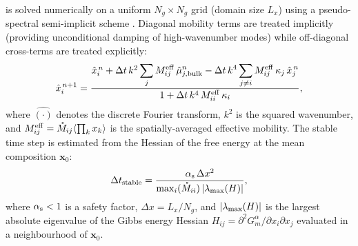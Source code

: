  is solved numerically on a uniform
$N_g \times N_g$ grid (domain size $L_x$) using a pseudo-spectral
semi-implicit scheme \cite{chen2002phase}.  Diagonal mobility terms
are treated implicitly (providing unconditional damping of
high-wavenumber modes) while off-diagonal cross-terms are treated
explicitly:
%
\begin{equation}\label{eq:semi_implicit}
    \hat{x}_i^{\,n+1}
    = \frac{
        \hat{x}_i^{\,n}
        + \Delta t\,k^2 \displaystyle\sum_j M^{\rm eff}_{ij}\,\hat{\mu}_{j,\rm bulk}^n
        - \Delta t\,k^4 \displaystyle\sum_{j \neq i} M^{\rm eff}_{ij}\,\kappa_j\,\hat{x}_j^{\,n}
      }{
        1 + \Delta t\,k^4\,M^{\rm eff}_{ii}\,\kappa_i
      },
\end{equation}
%
where $\hat{(\cdot)}$ denotes the discrete Fourier transform,
$k^2$ is the squared wavenumber, and
$M^{\rm eff}_{ij} = \mathring{M}_{ij}\langle\prod_k x_k\rangle$ is
the spatially-averaged effective mobility.  The stable time step is
estimated from the Hessian of the free energy at the mean composition
$\boldsymbol{x}_0$:
%
\begin{equation}\label{eq:dt_stable_pf}
    \Delta t_{\rm stable}
    = \frac{\alpha_{\rm s}\,\Delta x^2}
           {\max_i(\mathring{M}_{ii})\,|\lambda_{\rm max}(H)|},
\end{equation}
%
where $\alpha_{\rm s} < 1$ is a safety factor, $\Delta x = L_x/N_g$,
and $|\lambda_{\rm max}(H)|$ is the largest absolute eigenvalue of
the Gibbs energy Hessian $H_{ij} = \partial^2 G^\alpha_m/\partial
x_i\partial x_j$ evaluated in a neighbourhood of $\boldsymbol{x}_0$.


